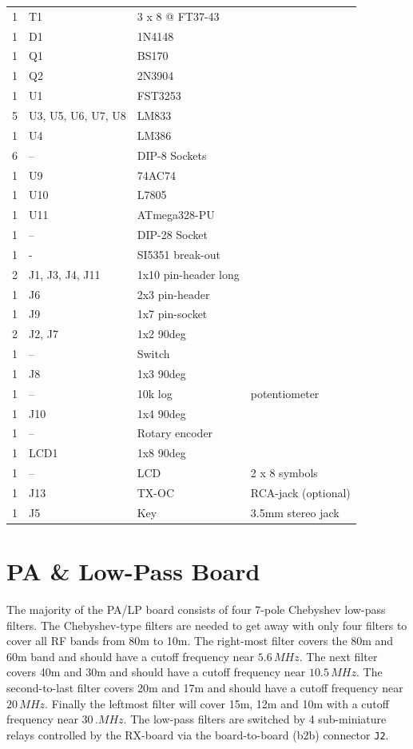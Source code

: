 \documentclass[10pt, a4paper,twoside]{scrartcl}
\begin{document}
\begin{longtable}{|l|p{6cm}|l|l|}
1 & T1 & 3 x 8 @ FT37-43 & \\
1 & D1 & 1N4148 & \\
1 & Q1 & BS170 & \\
1 & Q2 & 2N3904 & \\
1 & U1 & FST3253 & \\
5 & U3, U5, U6, U7, U8 & LM833 & \\
1 & U4 & LM386 & \\ 
6 & -- & DIP-8 Sockets & \\
1 & U9 & 74AC74 & \\
1 & U10 & L7805 & \\
1 & U11 & ATmega328-PU & \\
1 & --  & DIP-28 Socket & \\
1 & - & SI5351 break-out & \\
2 & J1, J3, J4, J11 & 1x10 pin-header long & \\
1 & J6 & 2x3 pin-header & \\
1 & J9 & 1x7 pin-socket & \\
2 & J2, J7 & 1x2 90deg & \\
1 & -- & Switch & \\
1 & J8 & 1x3 90deg & \\
1 & -- & 10k log & potentiometer \\
1 & J10 & 1x4 90deg & \\
1 & -- & Rotary encoder & \\
1 & LCD1 & 1x8 90deg & \\
1 & -- & LCD & 2 x 8 symbols \\
1 & J13 & TX-OC & RCA-jack (optional) \\
1 & J5 & Key & 3.5mm stereo jack\\ \hline
\end{longtable}


\cleardoublepage
\section{PA \& Low-Pass Board} \label{sec:pa}
The majority of the PA/LP board consists of four 7-pole Chebyshev low-pass filters. The Chebyshev-type filters are needed to get away with only four filters to cover all RF bands from 80m to 10m. The right-most filter covers the 80m and 60m band and should have a cutoff frequency near $5.6\,MHz$. The next filter covers 40m and 30m and should have a cutoff frequency near $10.5\,MHz$. The second-to-last filter covers 20m and 17m and should have a cutoff frequency near $20\,MHz$. Finally the leftmost filter will cover 15m, 12m and 10m with a cutoff frequency near $30\,.MHz$. The low-pass filters are switched by 4 sub-miniature relays controlled by the RX-board via the board-to-board (b2b) connector \texttt{J2}.
\end{document}
